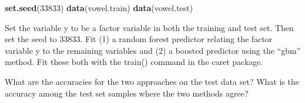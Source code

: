 \documentclass[]{article}
\newenvironment{Shaded}{\begin{snugshade}}{\end{snugshade}}
\newcommand{\KeywordTok}[1]{\textcolor[rgb]{0.13,0.29,0.53}{\textbf{#1}}}
\newcommand{\DataTypeTok}[1]{\textcolor[rgb]{0.13,0.29,0.53}{#1}}
\newcommand{\DecValTok}[1]{\textcolor[rgb]{0.00,0.00,0.81}{#1}}
\newcommand{\StringTok}[1]{\textcolor[rgb]{0.31,0.60,0.02}{#1}}
\newcommand{\CommentTok}[1]{\textcolor[rgb]{0.56,0.35,0.01}{\textit{#1}}}
\newcommand{\OperatorTok}[1]{\textcolor[rgb]{0.81,0.36,0.00}{\textbf{#1}}}
\newcommand{\NormalTok}[1]{#1}
\begin{document}
\begin{Shaded}
\begin{Highlighting}[]
\KeywordTok{set.seed}\NormalTok{(}\DecValTok{33833}\NormalTok{)}
\KeywordTok{data}\NormalTok{(vowel.train)}
\KeywordTok{data}\NormalTok{(vowel.test)}
\end{Highlighting}
\end{Shaded}

Set the variable y to be a factor variable in both the training and test
set. Then set the seed to 33833. Fit (1) a random forest predictor
relating the factor variable y to the remaining variables and (2) a
boosted predictor using the ``gbm'' method. Fit these both with the
train() command in the caret package.

What are the accuracies for the two approaches on the test data set?
What is the accuracy among the test set samples where the two methods
agree?



\begin{Shaded}
\end{Shaded}
\end{document}
